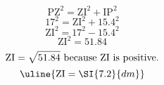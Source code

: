 \[\text{PZ}^{2}=\text{ZI}^{2}+\text{IP}^{2}\]
\[17^{2}=\text{ZI}^{2}+15.4^{2}\]
\[\text{ZI}^{2}=17^{2}-15.4^{2}\]
\[\text{ZI}^{2}=51.84\]
\[\text{ZI}=\sqrt{\mathstrut 51.84}\text{ because ZI is positive.}\]
\[\uline{\text{ZI}=\SI{7.2}{dm}}\]